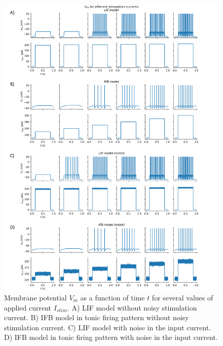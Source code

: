 \documentclass[10.5pt]{article}
\begin{document}
\begin{figure}
    \includegraphics[scale=0.065]{Vm}
    \centering
    \caption{Membrane potential \(V_{m}\) as a function of time \(t\) for several
    values of applied current \(I_{stim}\). A) LIF model without noisy stimulation current.
    B) IFB model in tonic firing pattern without noisy stimulation current. C) LIF model with
    noise in the input current. D) IFB model in tonic firing pattern with noise in the input current.}
    \label{fig:Vm}
\end{figure}
\end{document}
